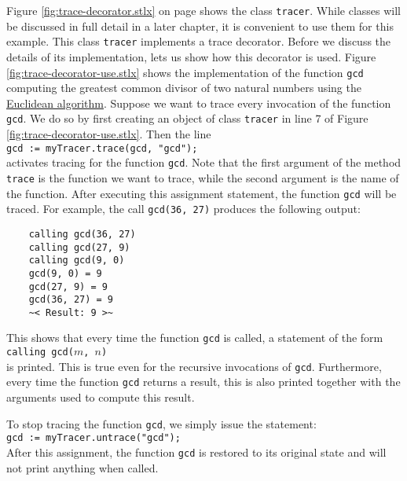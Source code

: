 Figure \ref{fig:trace-decorator.stlx} on page \pageref{fig:trace-decorator.stlx} shows the class
\texttt{tracer}.  While classes will be discussed in full detail in a later chapter, it is convenient 
to use them for this example.
This class \texttt{tracer} implements a trace decorator.  Before we discuss the details of its
implementation, lets us show how this decorator is used.  Figure \ref{fig:trace-decorator-use.stlx}
shows the implementation of the function \texttt{gcd} computing the greatest common divisor of two
natural numbers using the \href{http://en.wikipedia.org/wiki/Euclidean_algorithm}{Euclidean algorithm}.
Suppose we want to trace every invocation of the function \texttt{gcd}.  We do so by first creating
an object of class \texttt{tracer} in line 7 of Figure \ref{fig:trace-decorator-use.stlx}.  Then the line
\\[0.2cm]
\hspace*{1.3cm}
\texttt{gcd := myTracer.trace(gcd, "gcd");}
\\[0.2cm]
activates tracing for the function \texttt{gcd}.  Note that the first argument of the method
\texttt{trace} is the function we want to trace, while the second argument is the name of the function.
After executing this assignment statement, the function \texttt{gcd} will be traced.
For example, the call \texttt{gcd(36, 27)} produces the following output:
\begin{verbatim}
    calling gcd(36, 27)
    calling gcd(27, 9)
    calling gcd(9, 0)
    gcd(9, 0) = 9
    gcd(27, 9) = 9
    gcd(36, 27) = 9
    ~< Result: 9 >~
\end{verbatim}
This shows that every time the function \texttt{gcd} is called, a statement of the form
\\[0.2cm]
\hspace*{1.3cm}
\texttt{calling gcd($m$, $n$)}
\\[0.2cm]
is printed.  This is true even for the recursive invocations of \texttt{gcd}.  Furthermore,
every time the function \texttt{gcd} returns a result, this is also printed together with the
arguments used to compute this result.

To stop tracing the function \texttt{gcd}, we simply issue the statement:
\\[0.2cm]
\hspace*{1.3cm}
\texttt{gcd := myTracer.untrace("gcd");}
\\[0.2cm]
After this assignment, the function \texttt{gcd} is restored to its original state and will not print
anything when called.


